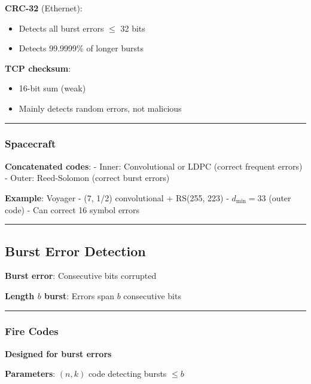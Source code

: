 \textbf{CRC-32} (Ethernet):
\begin{itemize}
\item Detects all burst errors $\leq$ 32 bits
\item Detects 99.9999\% of longer bursts
\end{itemize}

\textbf{TCP checksum}:
\begin{itemize}
\item 16-bit sum (weak)
\item Mainly detects random errors, not malicious
\end{itemize}

\begin{center}\rule{0.5\linewidth}{0.5pt}\end{center}

\subsubsection{Spacecraft}\label{spacecraft}

\textbf{Concatenated codes}: - Inner: Convolutional or LDPC (correct
frequent errors) - Outer: Reed-Solomon (correct burst errors)

\textbf{Example}: Voyager - (7, 1/2) convolutional + RS(255, 223) -
\(d_{\min} = 33\) (outer code) - Can correct 16 symbol errors

\begin{center}\rule{0.5\linewidth}{0.5pt}\end{center}

\subsection{Burst Error Detection}\label{burst-error-detection}

\textbf{Burst error}: Consecutive bits corrupted

\textbf{Length \(b\) burst}: Errors span \(b\) consecutive bits

\begin{center}\rule{0.5\linewidth}{0.5pt}\end{center}

\subsubsection{Fire Codes}\label{fire-codes}

\textbf{Designed for burst errors}

\textbf{Parameters}: $(n, k)$ code detecting bursts $\leq b$


